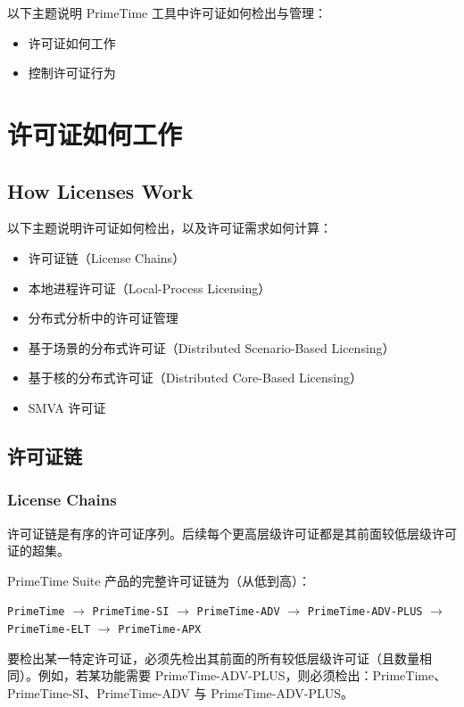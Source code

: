 \label{chap:licensing}

以下主题说明 PrimeTime 工具中许可证如何检出与管理：
\begin{itemize}
  \item 许可证如何工作
  \item 控制许可证行为
\end{itemize}

\section{许可证如何工作}
\subsection*{How Licenses Work}

以下主题说明许可证如何检出，以及许可证需求如何计算：
\begin{itemize}
  \item 许可证链（License Chains）
  \item 本地进程许可证（Local-Process Licensing）
  \item 分布式分析中的许可证管理
  \item 基于场景的分布式许可证（Distributed Scenario-Based Licensing）
  \item 基于核的分布式许可证（Distributed Core-Based Licensing）
  \item SMVA 许可证
\end{itemize}

\subsection{许可证链}
\subsubsection*{License Chains}

许可证链是有序的许可证序列。后续每个更高层级许可证都是其前面较低层级许可证的超集。

PrimeTime Suite 产品的完整许可证链为（从低到高）：
\begin{center}
\texttt{PrimeTime} $\rightarrow$
\texttt{PrimeTime-SI} $\rightarrow$
\texttt{PrimeTime-ADV} $\rightarrow$
\texttt{PrimeTime-ADV-PLUS} $\rightarrow$
\texttt{PrimeTime-ELT} $\rightarrow$
\texttt{PrimeTime-APX}
\end{center}

要检出某一特定许可证，必须先检出其前面的所有较低层级许可证（且数量相同）。例如，若某功能需要 PrimeTime-ADV-PLUS，则必须检出：PrimeTime、PrimeTime-SI、PrimeTime-ADV 与 PrimeTime-ADV-PLUS。

